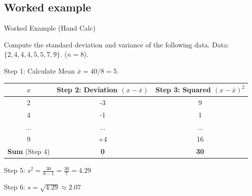 \subsection{Worked example}
\begin{frame}[allowframebreaks]{Worked Example (Hand Calc)}
\begin{example}
Compute the standard deviation and variance of the following data.
    Data: $\{ 2, 4, 4, 4, 5, 5, 7, 9 \}$. ($n=8$).
    \end{example}
   \pause
   \begin{solution}
  
    Step 1: Calculate Mean $\bar{x} = 40 / 8 = 5$.
    
    \begin{table}[h]
        \centering
        \begin{tabular}{ccc}
            \toprule
            $x$ & Step 2: Deviation $(x-\bar{x})$  & Step  3: Squared $(x-\bar{x})^2$ \\
            \midrule
            2 & -3 & 9 \\
            4 & -1 & 1 \\
            ... & ... & ... \\
            9 & +4 & 16 \\
            \midrule
            \textbf{Sum} (Step 4)& \textbf{0} & \textbf{30} \\
            \bottomrule
        \end{tabular}
      
    \end{table}
Step 5: $ s^2 = \frac{30}{8-1} = \frac{30}{7} = 4.29 $ 

Step 6: $ s = \sqrt{4.29} \approx 2.07 $
    \end{solution}
\end{frame}


